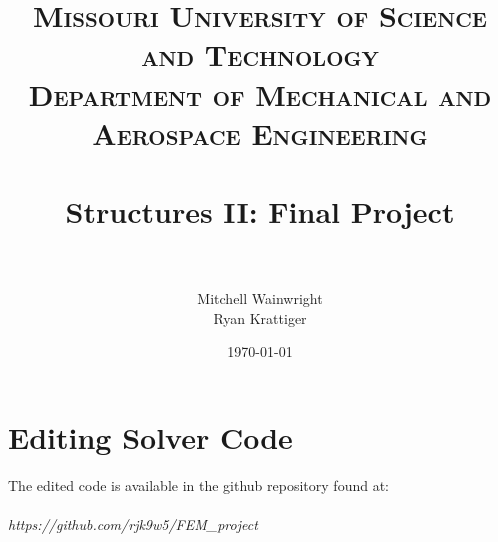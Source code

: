 \documentclass[paper=letter, fontsize=11pt]{scrartcl} %
\title{	
\normalfont \normalsize 
\textsc{Missouri University of Science and Technology \\ Department of Mechanical and Aerospace Engineering} \\ [25pt] %
\horrule{0.5pt} \\[0.4cm] %
\huge Structures II: Final Project \\ %
\horrule{2pt} \\[0.5cm] %
}
\author{Mitchell Wainwright \\ Ryan Krattiger} %
\date{\normalsize\today} %
\numberwithin{equation}{section} %
\numberwithin{figure}{section} %
\numberwithin{table}{section} %
\begin{document}
\maketitle %


\section{Editing Solver Code}

The edited code is available in the github repository found at: 
\\\\
\textit{https://github.com/rjk9w5/FEM\_project} 
\end{document}
